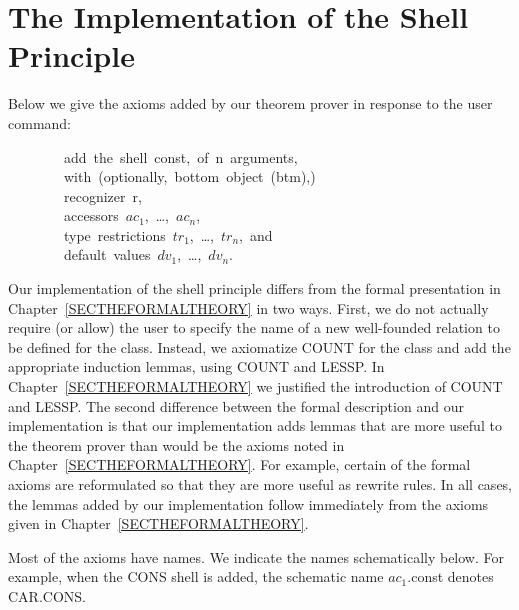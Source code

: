 \documentclass[11pt]{book}
\newenvironment{pubasis}{\begin{flushleft}\ttfamily\small}{\normalsize\rmfamily\end{flushleft}}
\newcommand{\pubdefaulttextsize}{\large}
\begin{document}
\chapter{The Implementation of the Shell Principle}
\label{APPSHELL}
\pubdefaulttextsize
Below we give the axioms added by our theorem prover
in response to the user command:
\begin{pubasis}
~~~~~~~~add~the~shell~const,~of~n~arguments,\\
~~~~~~~~with~(optionally,~bottom~object~(btm),)\\
~~~~~~~~recognizer~r,\\
~~~~~~~~accessors~$ac_{1}$,~\ldots{},~$ac_{n}$,\\
~~~~~~~~type~restrictions~$tr_{1}$,~\ldots{},~$tr_{n}$,~and\\
~~~~~~~~default~values~$dv_{1}$,~\ldots{},~$dv_{n}$.\\
\end{pubasis}
Our implementation of the shell principle differs from the formal
presentation in Chapter~\ref{SECTHEFORMALTHEORY} in two ways.  First,
we do not actually require (or allow) the user to specify the
name of a new well-founded relation to be defined for the class.
Instead, we axiomatize COUNT for the class and add the appropriate
induction lemmas, using COUNT and LESSP. In Chapter~\ref{SECTHEFORMALTHEORY}
we justified
the introduction of COUNT and LESSP.  The second difference between the formal
description and our implementation is that our implementation adds
lemmas that are more useful to the theorem prover than would be
the axioms noted in Chapter~\ref{SECTHEFORMALTHEORY}.  For example,
certain of the formal axioms are reformulated so that they are
more useful as rewrite rules.  In all cases, the lemmas added by
our implementation follow immediately from the axioms given
in Chapter~\ref{SECTHEFORMALTHEORY}.

Most of the axioms have names.  We indicate the names schematically
below.  For example, when the CONS shell is added, the schematic
name $ac_{1}$.const  denotes CAR.CONS.
\end{document}
